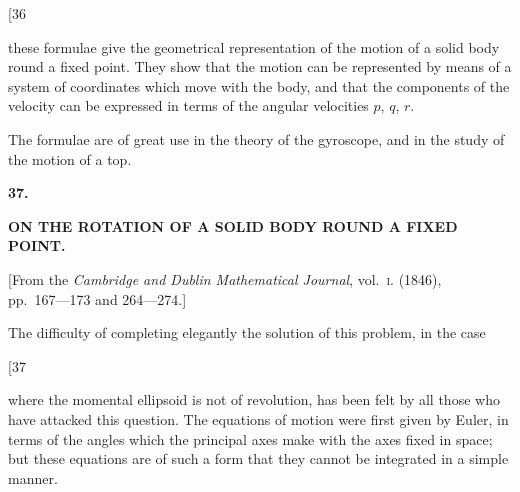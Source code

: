 \documentclass[11pt,a4paper]{article}
\begin{document}
\newpage
\setcounter{page}{237}

\begin{center}
{\small [36}
\end{center}
\vspace{-1em}

these formulae give the geometrical representation of the motion of a solid body
round a fixed point. They show that the motion can be represented by means of
a system of coordinates which move with the body, and that the components of the
velocity can be expressed in terms of the angular velocities $p$, $q$, $r$.

The formulae are of great use in the theory of the gyroscope, and in the study
of the motion of a top.


\newpage
{}
\setcounter{page}{237}

\begin{center}
{\large\bfseries 37.}
\end{center}
\vspace{0.5em}
\begin{center}
{\large\bfseries ON THE ROTATION OF A SOLID BODY ROUND A FIXED\\[0.3em]
POINT.}
\end{center}
\vspace{0.5em}
\begin{center}
{[From the \textit{Cambridge and Dublin Mathematical Journal}, vol.~\textsc{i}. (1846),\\
pp.~167---173 and 264---274.]}
\end{center}
\vspace{1em}

The difficulty of completing elegantly the solution of this problem, in the case

\newpage
\setcounter{page}{238}

\begin{center}
{\small [37}
\end{center}
\vspace{-1em}

where the momental ellipsoid is not of revolution, has been felt by all those who have
attacked this question. The equations of motion were first given by Euler, in terms
of the angles which the principal axes make with the axes fixed in space; but these
equations are of such a form that they cannot be integrated in a simple manner.
\end{document}
